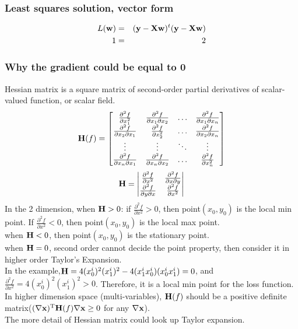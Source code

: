 \documentclass[12pt,a4paper]{article}
\begin{document}
\subsubsection*{Least squares solution, vector form}
\begin{eqnarray*}
L({\bf w})&=&({\bf y}-{\bf X}{\bf w})^t({\bf y}-{\bf X}{\bf w})\\
1&=&2
\end{eqnarray*}

\subsubsection*{Why the gradient could be equal to 0}
Hessian matrix is a square matrix of second-order partial derivatives of scalar-valued function, or scalar field.
\begin{equation}
{\bf H}(f) = \left[
\begin{matrix}
\frac{\partial^2f}{\partial x_1^2} & \frac{\partial^2f}{\partial x_1 \partial x_2} & \ldots & \frac{\partial^2f}{\partial x_1 \partial x_n}\\
\frac{\partial^2f}{\partial x_2 \partial x_1} & \frac{\partial^2f}{\partial x_2^2} & \ldots & \frac{\partial^2f}{\partial x_2 \partial x_n}\\
\vdots & \vdots & \ddots & \vdots\\
\frac{\partial^2f}{\partial x_n \partial x_1} & \frac{\partial^2f}{\partial x_n \partial x_2} & \ldots & \frac{\partial^2f}{\partial x_n^2}\\
\end{matrix}
\right]
\end{equation}
$$
{\bf H} = \left|
\begin{matrix}
\frac{\partial^2f}{\partial x^2} & \frac{\partial^2f}{\partial x \partial y}\\
 \frac{\partial^2f}{\partial y \partial x} & \frac{\partial^2f}{\partial x^2}\\
\end{matrix}
\right|
$$
In the 2 dimension, when ${\bf H}>0$: if $\frac{\partial^2f}{\partial x^2}>0$, then point$(x_0,y_0)$ is the local min point. If $\frac{\partial^2f}{\partial x^2}<0$, then point$(x_0,y_0)$ is the local max point.\\
when ${\bf H}<0$, then point$(x_0,y_0)$ is the  stationary point.\\
when ${\bf H}=0$, second order cannot decide the point property, then consider it in higher order Taylor's Expansion.\\
In the example,${\bf H} = 4(x_0^i)^2(x_1^i)^2-4(x_1^ix_0^i)(x_0^ix_1^i)=0$, and $\frac{\partial^2f}{\partial x^2}=4(x_0^i)^2(x_1^i)^2>0$. Therefore, it is a local min point for the loss function.
\\
In higher dimension space (multi-variables), ${\bf H}(f)$ should be a positive definite matrix($(\nabla {\bf x})^{\rm T}{\bf H}(f)\nabla {\bf x}\geq 0$ for any $\nabla {\bf x}$).\\
The more detail of Hessian matrix could look up Taylor expansion.
\end{document}
